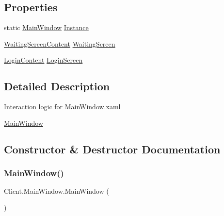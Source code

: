 \subsection*{Properties}
\begin{DoxyCompactItemize}
\item 
static \hyperlink{class_client_1_1_main_window}{Main\+Window} \hyperlink{class_client_1_1_main_window_ac993f8dee51f4006b909f4bcb2539c48}{Instance}
\item 
\hyperlink{class_client_1_1_waiting_screen_content}{Waiting\+Screen\+Content} \hyperlink{class_client_1_1_main_window_a519660def676d26438ff0f8360ae3808}{Waiting\+Screen}
\item 
\hyperlink{class_client_1_1_login_content}{Login\+Content} \hyperlink{class_client_1_1_main_window_ae029a0d1796624a1ae45e933692e941b}{Login\+Screen}
\end{DoxyCompactItemize}


\subsection{Detailed Description}
Interaction logic for Main\+Window.\+xaml 

\hyperlink{class_client_1_1_main_window}{Main\+Window} 

\subsection{Constructor \& Destructor Documentation}
\mbox{\label{class_client_1_1_main_window_ae7c58513aeb07a9645724b1215a8c4c7}} 
\subsubsection{\texorpdfstring{Main\+Window()}{MainWindow()}}
{\footnotesize\ttfamily Client.\+Main\+Window.\+Main\+Window (\begin{DoxyParamCaption}{ }\end{DoxyParamCaption})\hspace{0.3cm}{\ttfamily [inline]}}

